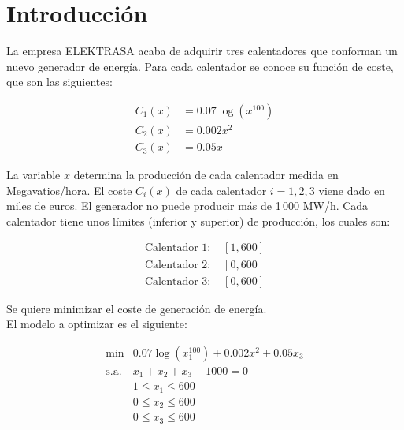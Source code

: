 \documentclass[12pt,a4paper,twoside,openright,titlepage,final]{article}
\author{José Ignacio Escribano}
\title{}
\begin{document}
\setcounter{page}{1}


\listoffigures
\thispagestyle{empty}
\newpage

\listoftables
\thispagestyle{empty}
\newpage

\tableofcontents
\thispagestyle{empty}
\newpage


\setcounter{page}{1}

\section{Introducción}

La empresa ELEKTRASA acaba de adquirir tres calentadores que conforman un nuevo generador de energía. Para cada calentador se conoce su función de coste, que son las siguientes:

\begin{align*}
C_1(x) & =  0.07\log(x^{100}) \\
C_2(x) & =  0.002x^2 \\
C_3(x) & =  0.05x
\end{align*}

La variable $x$ determina la producción de cada calentador medida en Megavatios/hora. El coste $C_i(x)$ de cada calentador $i=1,2,3$ viene dado en miles de euros. El generador no puede producir más de 1\,000 MW/h. Cada calentador tiene unos límites (inferior y superior) de producción, los cuales son:

\begin{eqnarray*}
\text{Calentador 1: } & [1, 600] \\
\text{Calentador 2: } & [0, 600] \\
\text{Calentador 3: } & [0, 600]
\end{eqnarray*}

Se quiere minimizar el coste de generación de energía.\\

El modelo a optimizar es el siguiente:

\begin{eqnarray*}
\mathrm{min} & 0.07\log(x_1^{100}) + 0.002x^2 + 0.05x_3\\
\text{s.a.}  & x_1 + x_2 + x_3 - 1000 = 0 \\
             & 1 \leq x_1 \leq 600 \\
             & 0 \leq x_2 \leq 600 \\
             & 0 \leq x_3 \leq 600
\end{eqnarray*}
\end{document}
